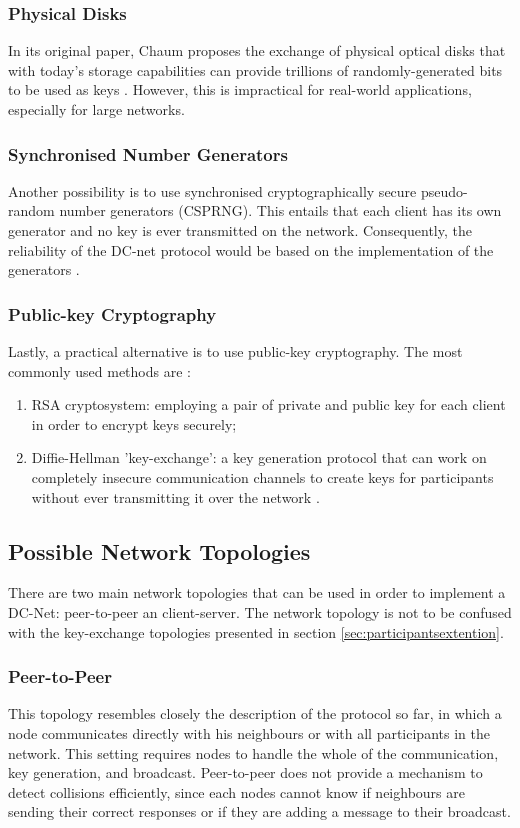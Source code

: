 \subsubsection{Physical Disks}
In its original paper, Chaum proposes the exchange of physical optical disks that with today's storage capabilities can provide trillions of randomly-generated bits to be used as keys \cite{Chaum}. However, this is impractical for real-world applications, especially for large networks. 

\subsubsection{Synchronised Number Generators}
Another possibility is to use synchronised cryptographically secure pseudo-random number generators (CSPRNG). This entails that each client has its own generator and no key is ever transmitted on the network. Consequently, the reliability of the DC-net protocol would be based on the implementation of the generators \cite{Chaum}.

\subsubsection{Public-key Cryptography}
Lastly, a practical alternative is to use public-key cryptography. The most commonly used methods are \cite{Chaum}:
\begin{enumerate}
    \item RSA cryptosystem: employing a pair of private and public key for each client in order to encrypt keys securely;
    \item Diffie-Hellman 'key-exchange': a key generation protocol that can work on completely insecure communication channels to create keys for participants without ever transmitting it over the network \cite{Golle}.
\end{enumerate}


\subsection{Possible Network Topologies} \label{sec:networkTopologies}
There are two main network topologies that can be used in order to implement a DC-Net: peer-to-peer an client-server. The network topology is not to be confused with the key-exchange topologies presented in section \ref{sec:participantsextention}.

\subsubsection{Peer-to-Peer} \label{sec:peertopeer}
This topology resembles closely the description of the protocol so far, in which a node communicates directly with his neighbours or with all participants in the network. This setting requires nodes to handle the whole of the communication, key generation, and broadcast.
Peer-to-peer does not provide a mechanism to detect collisions efficiently, since each nodes cannot know if neighbours are sending their correct responses or if they are adding a message to their broadcast.


